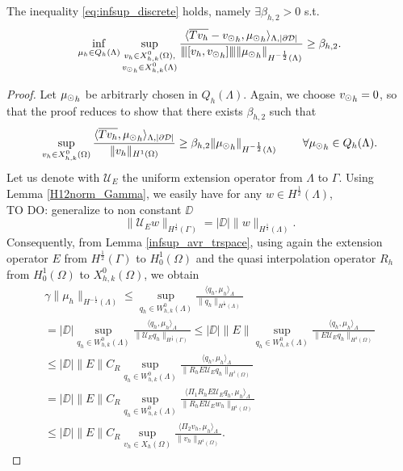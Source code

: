 \begin{theorem} The inequality \eqref{eq:infsup_discrete} holds, namely 
$\exists \beta_{h,2} >0$ s.t.
\begin{equation}
\inf_{\mu_h \in Q_h(\Lambda)} 
\sup_{\substack{v_h \in X^0_{h,k}(\Omega),\\ {v_{\odot}}_h \in X^0_{h,k}(\Lambda)} }\frac{\langle \overline{Tv_h} -  {v_{\odot}}_h, {\mu_{\odot}}_h \rangle _{\Lambda,|\partial\mathcal{D}|} } {{\left\vert\kern-0.25ex\left\vert\kern-0.25ex\left\vert [v_h, {v_{\odot}}_h] \right\vert\kern-0.25ex\right\vert\kern-0.25ex\right\vert} \|{\mu_{\odot}}_h\|_{H^{-\frac 12 }(\Lambda)} } 
\geq \beta_{h,2}. 
\end{equation}
\end{theorem}
\begin{proof}
Let ${\mu_{\odot}}_h$ be arbitrarly chosen in $Q_h(\Lambda)$. Again, we choose ${v_{\odot}}_h =0$, so that the proof reduces to show that there exists $\beta_{h,2}$ such that
\begin{equation*}
\sup_{v_h \in X_{h,k}^0(\Omega)} \frac{ \langle \overline{T v_h} , {\mu_{\odot}}_h \rangle _{\Lambda,|\partial\mathcal{D}|} } {\|v_h\|_{H^1(\Omega)} }\geq \beta_{h,2} \|{\mu_{\odot}}_h\|_{H^{-\frac 12}(\Lambda)}\ \qquad \forall {\mu_{\odot}}_h \in Q_h(\Lambda).
\end{equation*}
Let us denote with $\mathcal{U}_E$ the uniform extension operator from $\Lambda$ to $\Gamma$. Using Lemma \ref{H12norm_Gamma}, we easily have for any $w \in H^{\frac 12}(\Lambda)$,\\
{\color{red} TO DO: generalize to non constant $\DD$}
\begin{equation*}
\|\mathcal{U}_E w\|_{H^{\frac 12}(\Gamma)}=|\DD| \|w\|_{H^{\frac 12}(\Lambda)}.
\end{equation*}
Consequently, from Lemma \ref{infsup_avr_trspace}, using again the extension operator $E$ from $H^{\frac 12}(\Gamma)$ to $H^1_0(\Omega)$ and the quasi interpolation operator $R_h$ from $H^1_0(\Omega)$ to $X^0_{h,k}(\Omega)$, we obtain
\begin{multline}
\gamma \|\mu_h\|_{H^{-\frac 12}(\Lambda)} \leq 
\sup_{q_h \in W_{h,k}^0(\Lambda)} \frac{ \langle q_h, \mu_h \rangle_{\Lambda} } {\|q_h\|_{H^{\frac 12}(\Lambda)}} 
\\
= |\DD| \sup_{q_h \in W_{h,k}^0(\Lambda)} \frac{ \langle q_h, \mu_h \rangle _{\Lambda}} {\|\mathcal{U}_E q_h\|_{H^{\frac 12}(\Gamma)}} 
\leq |\DD|\|E\| \sup_{q_h \in W_{h,k}^0(\Lambda)} \frac{ \langle q_h, \mu_h \rangle _{\Lambda} } {\|E \mathcal{U}_E q_h\|_{H^1(\Omega)}} 
\\
\leq |\DD|\|E\| C_R \sup_{q_h \in W_{h,k}^0(\Lambda)} \frac{ \langle q_h, \mu_h \rangle _{\Lambda} } {\|R_h E \mathcal{U}_E q_h\|_{H^1(\Omega)}}
\\ 
=  |\DD|\|E\| C_R \sup_{q_h \in W_{h,k}^0(\Lambda)} \frac{ \langle \Pi _1  R_h E \mathcal{U}_E q_h, \mu_h \rangle _{\Lambda}} {\|R_h E \mathcal{U}_E w_h\|_{H^1(\Omega)}}
\\
\leq |\DD|\|E\| C_R \sup_{v_h \in X_h(\Omega)} \frac{ \langle \Pi _2  v_h, \mu_h \rangle _{\Lambda}} {\|v_h\|_{H^1(\Omega)}}. 
\end{multline}


\end{proof}
